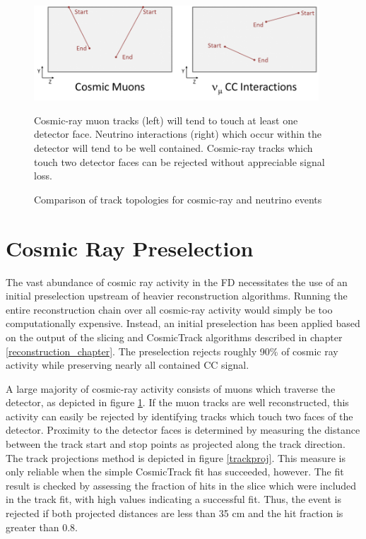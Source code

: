 \begin{figure}[t]
\begin{center}
\includegraphics[width=0.95\textwidth]{figures/selection/cosmicmuons.png}
\end{center}
\caption{Comparison of track topologies for cosmic-ray and neutrino events}{
Cosmic-ray muon tracks (left) will tend to touch at least one detector face.
Neutrino interactions (right) which occur within the detector will tend to
be well contained.
Cosmic-ray tracks which touch two detector faces can be rejected without
appreciable signal loss.
}

\label{cosmictracks}
\end{figure}



\section{Cosmic Ray Preselection}
\label{cosmicveto_section}

The vast abundance of cosmic ray activity in the FD necessitates the
use of an initial preselection upstream of heavier reconstruction
algorithms.
Running the entire reconstruction chain over all cosmic-ray activity would
simply be too computationally expensive.
Instead, an initial preselection has been applied based on the output
of the slicing and CosmicTrack algorithms described in chapter
\ref{reconstruction_chapter}.
The preselection rejects roughly 90\% of cosmic ray activity while preserving
nearly all contained \numu CC signal.

A large majority of cosmic-ray activity consists of muons which traverse the
detector, as depicted in figure \ref{cosmictracks}.
If the muon tracks are well reconstructed, this activity can easily be rejected
by identifying tracks which touch two faces of the detector.
Proximity to the detector faces is determined by measuring the distance
between the track start and stop points as projected along the track
direction.
The track projections method is depicted in figure \ref{trackproj}.
This measure is only reliable when the simple CosmicTrack fit has succeeded,
however.
The fit result is checked by assessing the fraction of hits in the slice
which were included in the track fit, with high values indicating a
successful fit.
Thus, the event is rejected if both projected distances are less than 35 cm and
the hit fraction is greater than 0.8.


